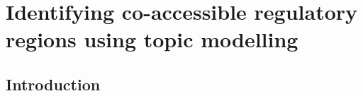 

\chapter{Identifying co-accessible regulatory regions using topic modelling}

\minitoc

\providecommand{\tightlist}{%
  \setlength{\itemsep}{0pt}\setlength{\parskip}{0pt}}


\section{Introduction} \label{ch4:intro}

